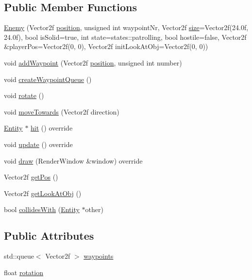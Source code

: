 \subsection*{Public Member Functions}
\begin{DoxyCompactItemize}
\item 
\hyperlink{class_enemy_aa606fada257eefe1469e462768285dff}{Enemy} (Vector2f \hyperlink{class_entity_a6af9d6498134ad0906011778bc5736db}{position}, unsigned int waypoint\+Nr, Vector2f \hyperlink{class_entity_ae9a0a364c85f91ade5088b3610131417}{size}=Vector2f(24.\+0f, 24.\+0f), bool is\+Solid=true, int state=states\+::patrolling, bool hostile=false, Vector2f \&player\+Pos=\+Vector2f(0, 0), Vector2f init\+Look\+At\+Obj=\+Vector2f(0, 0))
\item 
void \hyperlink{class_enemy_a5b54ac52247fc27b4860c04e8f1464d9}{add\+Waypoint} (Vector2f \hyperlink{class_entity_a6af9d6498134ad0906011778bc5736db}{position}, unsigned int number)
\item 
void \hyperlink{class_enemy_a9c48b3be7c2ebbb7dce8b45183299895}{create\+Waypoint\+Queue} ()
\item 
void \hyperlink{class_enemy_aa89bba7f1bb9f16c9cee861137968c30}{rotate} ()
\item 
void \hyperlink{class_enemy_aefbc9a7b2370957331e608932c458b52}{move\+Towards} (Vector2f direction)
\item 
\hyperlink{class_entity}{Entity} $\ast$ \hyperlink{class_enemy_a6cb8f8dbec88de9b2e95643709e349a3}{hit} () override
\item 
void \hyperlink{class_enemy_aa70d742da02995011f1618acc9e303db}{update} () override
\item 
void \hyperlink{class_enemy_a582d09158d692070f4becf68220bf6b6}{draw} (Render\+Window \&window) override
\item 
Vector2f \hyperlink{class_enemy_a65af045027f5fd7396b420f0d4c34dac}{get\+Pos} ()
\item 
Vector2f \hyperlink{class_enemy_aa55a89207573ebad16ba1556b105d692}{get\+Look\+At\+Obj} ()
\item 
bool \hyperlink{class_enemy_aa50adebfe1bd8b83a6a0571f3635c932}{collides\+With} (\hyperlink{class_entity}{Entity} $\ast$other)
\end{DoxyCompactItemize}
\subsection*{Public Attributes}
\begin{DoxyCompactItemize}
\item 
std\+::queue$<$ Vector2f $>$ \hyperlink{class_enemy_a0265035a86653dde11df05cd8f0ceaa5}{waypoints}
\item 
float \hyperlink{class_enemy_af0b960378e5235ef1e46a4ecdd85674d}{rotation}
\end{DoxyCompactItemize}

